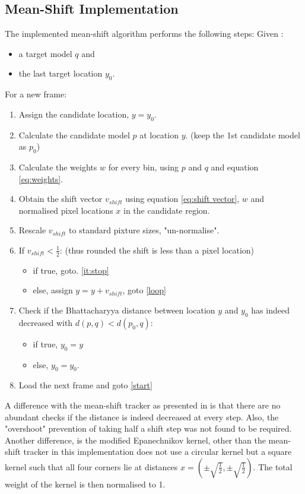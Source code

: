 \documentclass[a4paper,11pt]{article}
\begin{document}
\subsection{Mean-Shift Implementation}
The  implemented mean-shift algorithm performs the following steps:
Given : 
\begin{itemize}
\item a target model $q$ and
\item the last target location $y_0$.
\end{itemize}
For a new frame:
\begin{enumerate}
\item \label{start} Assign the candidate location, $y = y_0$.
\item \label{loop} Calculate the candidate model $p$ at location $y$. (keep the 1st candidate model as $p_0$)
\item Calculate the weights $w$ for every bin, using $p$ and $q$ and equation \ref{eq:weights}.
\item Obtain the shift vector $v_{shift}$ using equation \ref{eq:shift vector}, $w$ and normalised pixel locations $x$ in the candidate region.
\item Rescale $v_{shift}$ to standard pixture sizes, "un-normalise".
\item If $v_{shift} < \frac{1}{2}$: (thus rounded the shift is less than a pixel location)
\begin{itemize}
\item if true, goto. \ref{it:stop}
\item else, assign $y=y+v_{shift}$, goto \ref{loop}
\end{itemize}
\item \label{it:stop} Check if the Bhattacharyya distance between location $y$ and $y_0$ has indeed decreased with $d(p,q) < d(p_0,q)$: 
\begin{itemize}
\item if true, $y_0 = y$
\item else, $y_0 = y_0$.
\end{itemize}
\item Load the next frame and goto \ref{start}
\end{enumerate}

A difference with the mean-shift tracker as presented in \cite{mean_shift} is that there are no abundant checks if the distance is indeed decreased at every step. Also, the "overshoot" prevention of taking half a shift step was not found to be required. Another difference, is the modified  Epanechnikov kernel, other than the mean-shift tracker in \cite{mean_shift} this implementation does not use a circular kernel but a square kernel such that all four corners lie at distances $x=(\pm \sqrt{\frac{1}{2}},\pm \sqrt{\frac{1}{2}})$. The total weight of the kernel is then normalised to 1.
\end{document}
